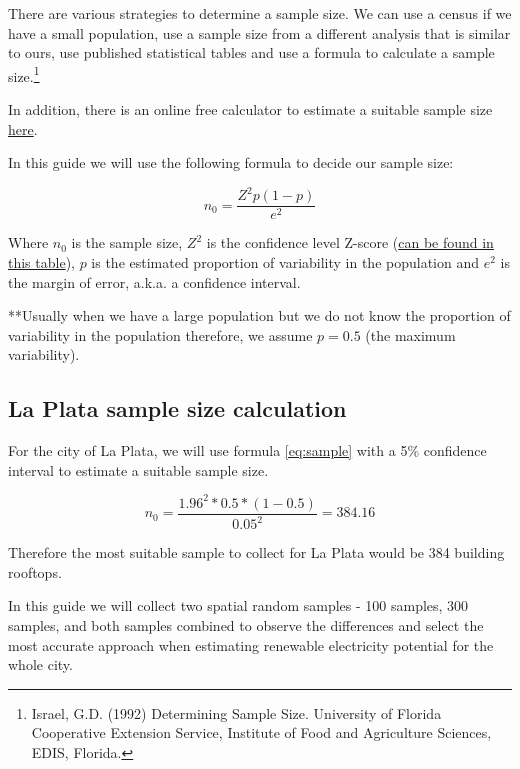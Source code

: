 \documentclass[
]{book}
\begin{document}
There are various strategies to determine a sample size. We can use a census if we have a small population, use a sample size from a different analysis that is similar to ours, use published statistical tables and use a formula to calculate a sample size.\footnote{Israel, G.D. (1992) Determining Sample Size. University of Florida Cooperative Extension Service, Institute of Food and Agriculture Sciences, EDIS, Florida.}

In addition, there is an online free calculator to estimate a suitable sample size \href{https://www.qualtrics.com/uk/experience-management/research/determine-sample-size/?rid=ip\&prevsite=en\&newsite=uk\&geo=DE\&geomatch=uk\#calculator}{here}.

In this guide we will use the following formula to decide our sample size:

\begin{equation} 
  n_0 = \frac{Z^2p(1-p)}{e^2} \label{eq:sample}
\end{equation}

Where \(n_0\) is the sample size, \(Z^2\) is the confidence level Z-score (\href{https://www.sjsu.edu/faculty/gerstman/StatPrimer/z-two-tails.pdf}{can be found in this table}), \(p\) is the estimated proportion of variability in the population and \(e^2\) is the margin of error, a.k.a. a confidence interval.

**Usually when we have a large population but we do not know the proportion of variability in the population therefore, we assume \(p=0.5\) (the maximum variability).

\hypertarget{la-plata-sample-size-calculation}{%
\subsection{La Plata sample size calculation}\label{la-plata-sample-size-calculation}}

For the city of La Plata, we will use formula \eqref{eq:sample} with a 5\% confidence interval to estimate a suitable sample size.

\begin{equation} 
  n_0 = \frac{1.96^2*0.5*(1-0.5)}{0.05^2} = 384.16 \label{eq:sample1}
\end{equation}

Therefore the most suitable sample to collect for La Plata would be 384 building rooftops.

In this guide we will collect two spatial random samples - 100 samples, 300 samples, and both samples combined to observe the differences and select the most accurate approach when estimating renewable electricity potential for the whole city.
\end{document}
